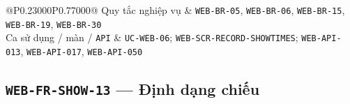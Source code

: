 \begin{longtable}{@{}P{0.23000\SRSWidth}P{0.77000\SRSWidth}@{}}
Quy tắc nghiệp vụ & \texttt{WEB-\allowbreak{}BR-\allowbreak{}05}, \texttt{WEB-\allowbreak{}BR-\allowbreak{}06}, \texttt{WEB-\allowbreak{}BR-\allowbreak{}15}, \texttt{WEB-\allowbreak{}BR-\allowbreak{}19}, \texttt{WEB-\allowbreak{}BR-\allowbreak{}30} \\[3pt]
Ca sử dụng /\allowbreak{} màn /\allowbreak{} \texttt{API} & \texttt{UC-\allowbreak{}WEB-\allowbreak{}06}; \texttt{WEB-\allowbreak{}SCR-\allowbreak{}RECORD-\allowbreak{}SHOWTIME\allowbreak{}S}; \texttt{WEB-\allowbreak{}API-\allowbreak{}013}, \texttt{WEB-\allowbreak{}API-\allowbreak{}017}, \texttt{WEB-\allowbreak{}API-\allowbreak{}050} \\[3pt]
\end{longtable}
\endgroup

\subsection{\texttt{WEB-\allowbreak{}FR-\allowbreak{}SHOW-\allowbreak{}13} — Định dạng chiếu}
\begingroup
\fontsize{9.5}{12}\selectfont
\setlength{\SRSWidth}{\dimexpr\linewidth-2\tabcolsep\relax}
